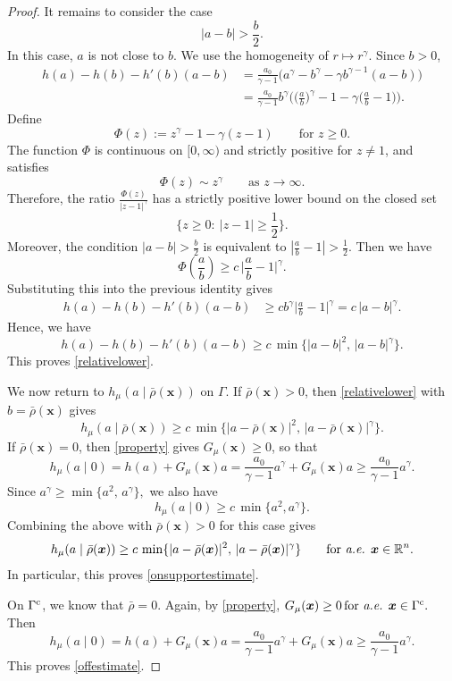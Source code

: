 \documentclass[reqno,11pt]{amsart}
\numberwithin{equation}{section}
\theoremstyle{definition}
\begin{document}
\begin{proof}
It remains to consider the case
\[  |a-b|>\frac b2 .
\]
In this case, $a$ is not close to $b$.  We use the homogeneity of
$r\mapsto r^\gamma$.  Since $b>0$,
\[
\begin{aligned}
h(a)-h(b)-h'(b)(a-b)
 &= \frac{a_0}{\gamma-1}
 \big(a^\gamma-b^\gamma-\gamma b^{\gamma-1}(a-b)
  \big)                                      \\
 &=  \frac{a_0}{\gamma-1}b^\gamma \Big(\big(\frac ab\big)^\gamma -1-\gamma\big(\frac ab-1\big) \Big).
\end{aligned}
\]
Define
\[
\Phi(z):=z^\gamma-1-\gamma(z-1)  \qquad \mbox{for $z\ge 0$}.
\]
The function $\Phi$ is continuous on $[0,\infty)$ and strictly positive for
$z\ne1$, and satisfies
\[\Phi(z)\sim z^\gamma
      \qquad\text{as }z\to\infty .
\]
Therefore, the ratio
$\frac{\Phi(z)}{|z-1|^\gamma}$
has a strictly positive lower bound on the closed set
\[
\big\{z\ge0:\ |z-1|\ge\frac12\big\}.
\]
Moreover, the condition $|a-b|>\frac{b}{2}$ is equivalent to
$\left|\frac ab-1\right|>\frac12.$
Then we have
\[ 
\Phi(\frac ab) \ge c\,\big|\frac ab-1\big|^\gamma .
\]
Substituting this into the previous identity gives
\[
\begin{aligned}
  h(a)-h(b)-h'(b)(a-b)  &\ge  c b^\gamma \big|\frac ab-1\big|^\gamma
  =c\,|a-b|^\gamma.
\end{aligned}
\]
Hence, we have 
\[h(a)-h(b)-h'(b)(a-b)  \ge
   c\,\min\{|a-b|^2,\,|a-b|^\gamma\}.
\]
This proves \eqref{relativelower}.

We now return to $h_\mu(a\mid\bar\rho(\boldsymbol{x}))$ on $\Gamma$.
If $\bar\rho(\boldsymbol{x})>0$, then
\eqref{relativelower} with
$b=\bar\rho(\boldsymbol{x})$ gives
\[
h_\mu(a\mid\bar\rho(\boldsymbol{x})) 
\ge c\,\min\{|a-\bar\rho(\boldsymbol{x})|^2,\,|a-\bar\rho(\boldsymbol{x})|^\gamma\}.
\]
If $\bar\rho(\boldsymbol{x})=0$, then 
\eqref{property} gives $G_\mu(\boldsymbol{x})\ge0$,
so that
\[ h_\mu(a\mid0) =  h(a)+G_\mu(\boldsymbol{x})a =
  \frac{a_0}{\gamma-1}a^\gamma+G_\mu(\boldsymbol{x})a\ge   \frac{a_0}{\gamma-1}a^\gamma.
\]
Since $a^\gamma\ge \min\{a^2,\,a^\gamma\},$
we also have
\[   h_\mu(a\mid0)  \ge c\,\min\{a^2,a^\gamma\}.
\]
Combining the above 
with $\bar\rho(\boldsymbol{x})>0$ for this case gives
\[h_\mu(a\mid\bar\rho(\boldsymbol{x})) 
\ge c\,\min\{|a-\bar\rho(\boldsymbol{x})|^2,
\,|a-\bar\rho(\boldsymbol{x})|^\gamma\} \qquad\text{for {\it a.e.} }\boldsymbol{x}\in \mathbb{R}^n.
\]
In particular, this proves \eqref{onsupportestimate}.

On $\Gamma^{\rm c}$, we know that $\bar\rho=0$.  Again, by 
\eqref{property},
$G_\mu(\boldsymbol{x})\ge0\,
\text{for {\it a.e.} }\boldsymbol{x}\in \Gamma^{\rm c}.$
Then
\[  h_\mu(a\mid0)=h(a)+G_\mu(\boldsymbol{x})a =\frac{a_0}{\gamma-1}a^\gamma+G_\mu(\boldsymbol{x})a  \ge  \frac{a_0}{\gamma-1}a^\gamma.
\]
This proves \eqref{offestimate}.


\end{proof}
\end{document}
